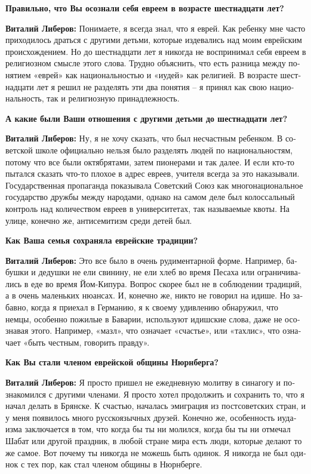 \begin{otherlanguage}{russian}
	\textbf{Правильно, что Вы осознали себя евреем в возрасте шестнадцати лет?}  
	
	\textbf{Виталий Либеров:} Понимаете, я всегда знал, что я еврей. Как ребенку мне часто приходилось драться с другими детьми, которые издевались над моим еврейским происхождением. Но до шестнадцати лет я никогда не воспринимал себя евреем в религиозном смысле этого слова. Трудно объяснить, что есть разница между понятием «еврей» как национальностью и «иудей» как религией. В возрасте шестнадцати лет я решил не разделять эти два понятия – я принял как свою национальность, так и религиозную принадлежность. 
	
	\textbf{А какие были Ваши отношения с другими детьми до шестнадцати лет?}
	
	\textbf{Виталий Либеров:} Ну, я не хочу сказать, что был несчастным ребенком. В советской школе официально нельзя было разделять людей по национальностям, потому что все были октябрятами, затем пионерами и так далее. И если кто-то пытался сказать что-то плохое в адрес евреев, учителя всегда за это наказывали. Государственная пропаганда показывала Советский Союз как многонациональное государство дружбы между народами, однако на самом деле был колоссальный контроль над количеством евреев в университетах, так называемые квоты. На улице, конечно же, антисемитизм среди детей был. 
	
	\textbf{Как Ваша семья сохраняла еврейские традиции?} 
	
	\textbf{Виталий Либеров:} Это все было в очень рудиментарной форме. Например, бабушки и дедушки не ели свинину, не ели хлеб во время Песаха или ограничивались в еде во время Йом-Кипура. Вопрос скорее был не в соблюдении традиций, а в очень маленьких нюансах. И, конечно же, никто не говорил на идише. Но забавно, когда я приехал в Германию, я к своему удивлению обнаружил, что немцы, особенно пожилые в Баварии, используют идишские слова, даже не осознавая этого. Например, «мазл», что означает «счастье», или «тахлис», что означает «быть честным, говорить правду». 
	
	\textbf{Как Вы стали членом еврейской общины Нюрнберга?} 
	
	\textbf{Виталий Либеров:} Я просто пришел не ежедневную молитву в синагогу и познакомился с другими членами. Я просто хотел продолжить и сохранить то, что я начал делать в Брянске. К счастью, началась эмиграция из постсоветских стран, и у меня появилось много русскоязычных друзей. Конечно же, особенность иудаизма заключается в том, что когда бы ты ни молился, когда бы ты ни отмечал Шабат или другой праздник, в любой стране мира есть люди, которые делают то же самое. Вот почему ты никогда не можешь быть одинок. Я никогда не был одинок с тех пор, как стал членом общины в Нюрнберге. 
	

\end{otherlanguage}
